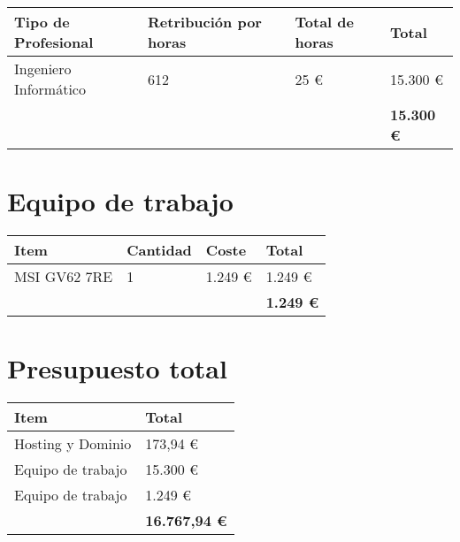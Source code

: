 \begin{table}[h]
	\centering
	\begin{tabular}{| p{5cm} | p{2cm} | p{1.6cm} | p{2.3cm} |}
		\rowcolor[HTML]{329A9D} 
		{\color[HTML]{FFFFFF} \textbf{Tipo de Profesional}} & {\color[HTML]{FFFFFF} \textbf{Retribución por horas}} & {\color[HTML]{FFFFFF} \textbf{Total de horas}} & {\color[HTML]{FFFFFF} \textbf{Total}} \\ \hline
		Ingeniero Informático & 612 & 25 \euro & 15.300 \euro \\ \hline
		&  & & \textbf{15.300 \euro }\\ \hline
	\end{tabular}
\end{table}

\section{Equipo de trabajo}

\begin{table}[h]
	\centering
	\begin{tabular}{| p{5cm} | p{2cm} | p{1.6cm} | p{2.3cm} |}
		\rowcolor[HTML]{329A9D} 
		{\color[HTML]{FFFFFF} \textbf{Item}} & {\color[HTML]{FFFFFF} \textbf{Cantidad}} & {\color[HTML]{FFFFFF} \textbf{Coste}} & {\color[HTML]{FFFFFF} \textbf{Total}} \\ \hline
		MSI GV62 7RE & 1 & 1.249 \euro & 1.249 \euro \\ \hline
		&  & & \textbf{1.249 \euro }\\ \hline
	\end{tabular}
\end{table}

\section{Presupuesto total}

\begin{table}[h]
	\centering
	\begin{tabular}{| p{8.6cm} | p{2.3cm} |}
		\rowcolor[HTML]{329A9D} 
		{\color[HTML]{FFFFFF} \textbf{Item}} & {\color[HTML]{FFFFFF} \textbf{Total}} \\ \hline
		Hosting y Dominio & 173,94 \euro \\ \hline
		Equipo de trabajo & 15.300 \euro \\ \hline
		Equipo de trabajo & 1.249 \euro \\ \hline
		& \textbf{16.767,94 \euro }\\ \hline
	\end{tabular}
\end{table}